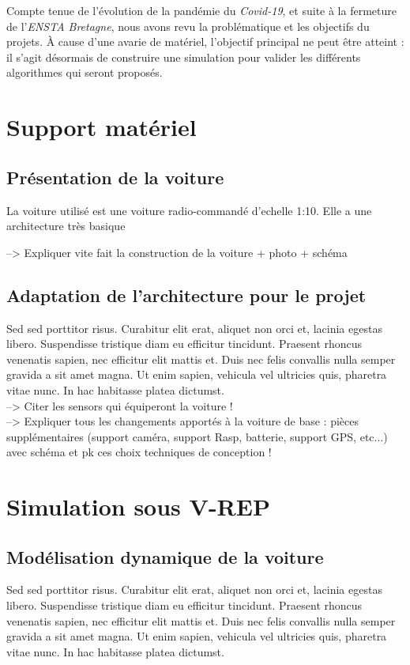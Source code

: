 \documentclass[12pt, openany]{report}
\begin{document}
Compte tenue de l'évolution de la pandémie du \textit{Covid-19}, et suite à la fermeture de l'\textit{ENSTA Bretagne}, nous avons revu la problématique et les objectifs du projets. À cause d'une avarie de matériel, l'objectif principal ne peut être atteint : il s'agit désormais de construire une simulation pour valider les différents algorithmes qui seront proposés.

\section{Support matériel}
\subsection{Présentation de la voiture}

La voiture utilisé est une voiture radio-commandé d'echelle 1:10. Elle a une architecture très basique

--> Expliquer vite fait la construction de la voiture + photo + schéma

\subsection{Adaptation de l'architecture pour le projet}
Sed sed porttitor risus. Curabitur elit erat, aliquet non orci et, lacinia egestas libero. Suspendisse tristique diam eu efficitur tincidunt. Praesent rhoncus venenatis sapien, nec efficitur elit mattis et. Duis nec felis convallis nulla semper gravida a sit amet magna. Ut enim sapien, vehicula vel ultricies quis, pharetra vitae nunc. In hac habitasse platea dictumst.\\

--> Citer les sensors qui équiperont la voiture !\\

--> Expliquer tous les changements apportés à la voiture de base : pièces supplémentaires (support caméra, support Rasp, batterie, support GPS, etc...) avec schéma et pk ces choix techniques de conception !

\section{Simulation sous \textsc{V-REP}}
\subsection{Modélisation dynamique de la voiture}
Sed sed porttitor risus. Curabitur elit erat, aliquet non orci et, lacinia egestas libero. Suspendisse tristique diam eu efficitur tincidunt. Praesent rhoncus venenatis sapien, nec efficitur elit mattis et. Duis nec felis convallis nulla semper gravida a sit amet magna. Ut enim sapien, vehicula vel ultricies quis, pharetra vitae nunc. In hac habitasse platea dictumst.\\
\end{document}
